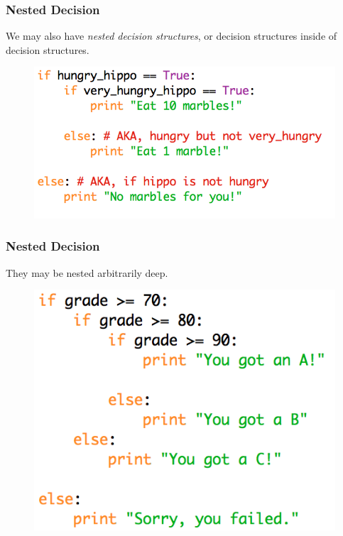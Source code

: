 \documentclass{beamer}
\begin{document}
\begin{frame}[fragile]
\frametitle{Nested Decision}

We may also have \emph{nested decision structures}, or decision structures inside of decision structures.

\begin{figure}
\centering
\includegraphics[scale=0.8]{IMG/hippo.png}
\end{figure}
\end{frame}

\begin{frame}
\frametitle{Nested Decision}

They may be nested arbitrarily deep.

\begin{figure}
\centering
\includegraphics[scale=0.8]{IMG/nested_grade.png}
\end{figure}
\end{frame}
\end{document}
